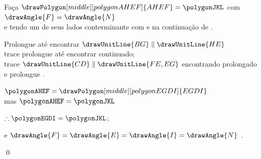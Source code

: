 \documentclass[booklanguage=brazilian]{byrnebook}
\begin{document}
\begin{center}
Faça $\drawPolygon[middle][polygonAHEF]{AHEF} = \polygonJKL$ com $\drawAngle{F} = \drawAngle{N}$ \\
e tendo um de seus lados  conterminante com e na continuação de .

Prolongue  até encontrar $\drawUnitLine{BG} \parallel \drawUnitLine{HE}$\\
trace  prolongue até encontrar  continuado;\\
trace $\drawUnitLine{CD} \parallel \drawUnitLine{FE,EG}$ encontrando  prolongado e prolongue .

$\polygonAHEF = \drawPolygon[middle][polygonEGDI]{EGDI}$ \\
mas $\polygonAHEF = \polygonJKL$ \byref{\constref}

$\therefore \polygonEGDI = \polygonJKL$;

e $\drawAngle{F} = \drawAngle{E} =\drawAngle{I} = \drawAngle{N}$ . %
\end{center}

\qed
\end{document}
